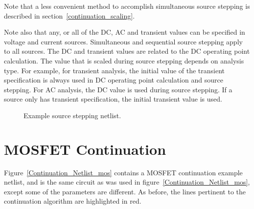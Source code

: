 Note that a less convenient method to accomplish simultaneous source stepping is described in 
section~\ref{continuation_scaling}.

Note also that any, or all of the DC, AC and transient values can be specified in voltage
and current sources. Simultaneous and sequential source stepping apply to all sources. 
The DC and transient values are related to the DC operating point calculation. The value 
that is scaled during source stepping depends on analysis type. For example, for transient 
analysis, the initial value of the transient specification is always used in DC operating
point calculation and source stepping. For AC analysis, the DC value is used during source 
stepping. If a source only has transient specification, the initial transient value is used.

\begin{figure}[htbp]
\begin{centering}
\caption [Example source stepping netlist.]{Example source stepping netlist. 
\label  {sourceStep_netlist}}
\end{centering}
\end{figure}

\newpage 
\section{MOSFET Continuation}
\label{continuation_mosfet}

Figure~\ref{Continuation_Netlist_mos} contains a MOSFET continuation example netlist, and is the same circuit as was used in figure~\ref{Continuation_Netlist_mos}, except some of the parameters are different.  As before, the lines pertinent to the continuation algorithm are highlighted in red.  

